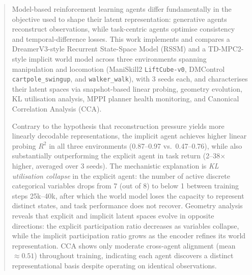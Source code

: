 \documentclass{article}
\begin{document}

\begin{abstract}
Model-based reinforcement learning agents differ fundamentally in the objective used
to shape their latent representation: generative agents reconstruct observations, while
task-centric agents optimise consistency and temporal-difference losses.
This work implements and compares a DreamerV3-style Recurrent State-Space Model (RSSM)
and a TD-MPC2-style implicit world model across three environments spanning manipulation
and locomotion (ManiSkill2 \texttt{LiftCube-v0}, DMControl \texttt{cartpole\_swingup},
and \texttt{walker\_walk}), with 3 seeds each, and characterises their latent spaces via
snapshot-based linear probing, geometry evolution, KL utilisation analysis,
MPPI planner health monitoring, and Canonical Correlation Analysis (CCA).

Contrary to the hypothesis that reconstruction pressure yields more linearly decodable
representations, the implicit agent achieves higher linear probing $R^2$ in all three
environments (0.87--0.97 vs.\ 0.47--0.76), while also substantially outperforming the
explicit agent in task return (2--38$\times$ higher, averaged over 3 seeds).
The mechanistic explanation is \emph{KL utilisation collapse} in the explicit agent:
the number of active discrete categorical variables drops from 7 (out of 8) to below 1
between training steps 25k--40k, after which the world model loses the capacity to
represent distinct states, and task performance does not recover.
Geometry analysis reveals that explicit and implicit latent spaces evolve in opposite
directions: the explicit participation ratio decreases as variables collapse, while the
implicit participation ratio grows as the encoder refines its world representation.
CCA shows only moderate cross-agent alignment (mean $\approx 0.51$) throughout training,
indicating each agent discovers a distinct representational basis despite operating on
identical observations.
\end{abstract}
\end{document}
